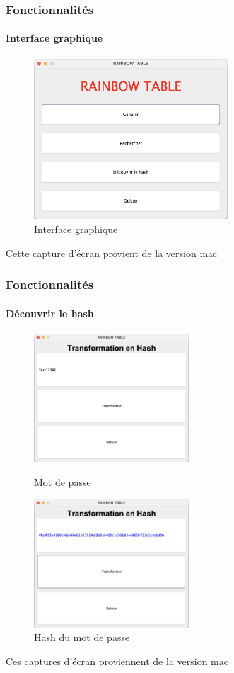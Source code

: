 \documentclass{beamer}
\begin{document}
\begin{frame}
\frametitle{Fonctionnalités}
\framesubtitle {Interface graphique}
\begin{figure}[H]
\centering
\includegraphics[height=6cm]{img/interface.png}
\caption{Interface graphique}
\end{figure}
\vfill
  \tiny *Cette capture d'écran provient de la version mac\hfill
\end{frame}

\begin{frame}
\frametitle{Fonctionnalités}
\framesubtitle {Découvrir le hash}

\begin{figure}
\centering
\begin{minipage}{0.49\textwidth}
\includegraphics[height=4.8cm]{img/transform.png}
\caption{\small Mot de passe}
\end{minipage}
\begin{minipage}{0.49\textwidth}
\centering
\includegraphics[height=4.8cm]{img/transform2.png}
\caption{\small Hash du mot de passe}
\end{minipage}
\end{figure}
\vfill
  \tiny *Ces captures d'écran proviennent de la version mac
\hfill
\end{frame}
\end{document}
